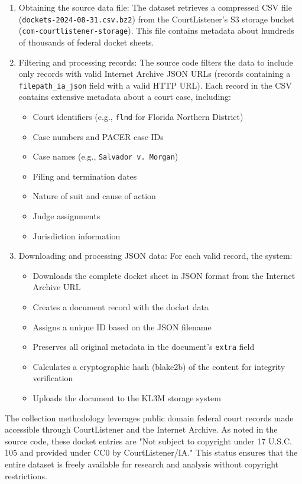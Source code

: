 \begin{enumerate}
  \item Obtaining the source data file: The dataset retrieves a compressed CSV file (\texttt{dockets-2024-08-31.csv.bz2}) from the CourtListener's S3 storage bucket (\texttt{com-courtlistener-storage}). This file contains metadata about hundreds of thousands of federal docket sheets.
  
  \item Filtering and processing records: The source code filters the data to include only records with valid Internet Archive JSON URLs (records containing a \texttt{filepath\_ia\_json} field with a valid HTTP URL). Each record in the CSV contains extensive metadata about a court case, including:
  \begin{itemize}
    \item Court identifiers (e.g., \texttt{flnd} for Florida Northern District)
    \item Case numbers and PACER case IDs
    \item Case names (e.g., \texttt{Salvador v. Morgan})
    \item Filing and termination dates
    \item Nature of suit and cause of action
    \item Judge assignments
    \item Jurisdiction information
  \end{itemize}
  
  \item Downloading and processing JSON data: For each valid record, the system:
  \begin{itemize}
    \item Downloads the complete docket sheet in JSON format from the Internet Archive URL
    \item Creates a document record with the docket data
    \item Assigns a unique ID based on the JSON filename
    \item Preserves all original metadata in the document's \texttt{extra} field
    \item Calculates a cryptographic hash (blake2b) of the content for integrity verification
    \item Uploads the document to the KL3M storage system
  \end{itemize}
\end{enumerate}

The collection methodology leverages public domain federal court records made accessible through CourtListener and the Internet Archive. As noted in the source code, these docket entries are "Not subject to copyright under 17 U.S.C. 105 and provided under CC0 by CourtListener/IA." This status ensures that the entire dataset is freely available for research and analysis without copyright restrictions.

